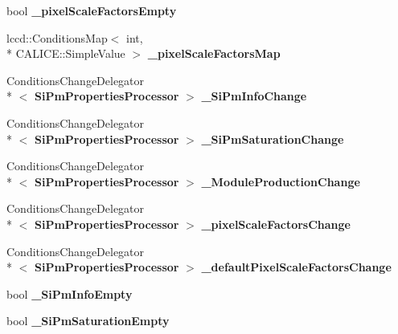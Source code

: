 \begin{DoxyCompactItemize}
\item 
bool {\bfseries \-\_\-pixel\-Scale\-Factors\-Empty}\label{classCALICE_1_1SiPmPropertiesProcessor_ad0f2dd1b49e6ce68019984f64ca5e994}

\item 
lccd\-::\-Conditions\-Map$<$ int, \\*
C\-A\-L\-I\-C\-E\-::\-Simple\-Value $>$ {\bfseries \-\_\-pixel\-Scale\-Factors\-Map}\label{classCALICE_1_1SiPmPropertiesProcessor_a00f1e01ad1c585c5fa33ff048ad3e17a}

\item 
Conditions\-Change\-Delegator\\*
$<$ {\bf Si\-Pm\-Properties\-Processor} $>$ {\bfseries \-\_\-\-Si\-Pm\-Info\-Change}\label{classCALICE_1_1SiPmPropertiesProcessor_abfa2958127c2f592a9cf1861bf6f8b8a}

\item 
Conditions\-Change\-Delegator\\*
$<$ {\bf Si\-Pm\-Properties\-Processor} $>$ {\bfseries \-\_\-\-Si\-Pm\-Saturation\-Change}\label{classCALICE_1_1SiPmPropertiesProcessor_afffde1d70dd6fc1d52b50f12c13de3ef}

\item 
Conditions\-Change\-Delegator\\*
$<$ {\bf Si\-Pm\-Properties\-Processor} $>$ {\bfseries \-\_\-\-Module\-Production\-Change}\label{classCALICE_1_1SiPmPropertiesProcessor_a0d2cbe6dab804d78d8eb27a8f3af787f}

\item 
Conditions\-Change\-Delegator\\*
$<$ {\bf Si\-Pm\-Properties\-Processor} $>$ {\bfseries \-\_\-pixel\-Scale\-Factors\-Change}\label{classCALICE_1_1SiPmPropertiesProcessor_a11a48bdf9a5840d090ef9047b03fcfd4}

\item 
Conditions\-Change\-Delegator\\*
$<$ {\bf Si\-Pm\-Properties\-Processor} $>$ {\bfseries \-\_\-default\-Pixel\-Scale\-Factors\-Change}\label{classCALICE_1_1SiPmPropertiesProcessor_ace4d68c1d75ec060bc60a8ba69014dc1}

\item 
bool {\bfseries \-\_\-\-Si\-Pm\-Info\-Empty}\label{classCALICE_1_1SiPmPropertiesProcessor_adba4eeb5243a0fd5198ab9ffb0979998}

\item 
bool {\bfseries \-\_\-\-Si\-Pm\-Saturation\-Empty}\label{classCALICE_1_1SiPmPropertiesProcessor_acb305e30ef61ea06ee84d4188d51aeaf}


\end{DoxyCompactItemize}
